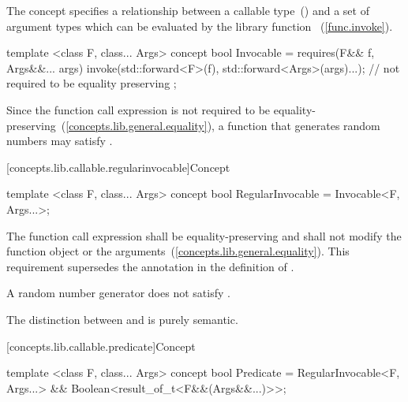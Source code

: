 \pnum
The  concept specifies a relationship between a callable
type~()  and a set of argument types  which
can be evaluated by the library function ~(\ref{func.invoke}).

%
\begin{itemdecl}
template <class F, class... Args>
concept bool Invocable =
  requires(F&& f, Args&&... args) {
    invoke(std::forward<F>(f), std::forward<Args>(args)...); // not required to be equality preserving
  };
\end{itemdecl}

\begin{itemdescr}
\pnum
\enternote Since the  function call
expression is not required to be
equality-preserving~(\ref{concepts.lib.general.equality}), a function that generates random numbers
may satisfy .\exitnote
\end{itemdescr}

[concepts.lib.callable.regularinvocable]{Concept }

%
\begin{itemdecl}
template <class F, class... Args>
concept bool RegularInvocable =
  Invocable<F, Args...>;
\end{itemdecl}

\begin{itemdescr}
\pnum
The  function call expression shall be equality-preserving and
shall not modify the function object or the arguments~(\ref{concepts.lib.general.equality}).
\enternote This requirement supersedes the
annotation in the definition of . \exitnote

\pnum
\enternote A random number generator does not satisfy
.\exitnote

\pnum
\enternote The distinction between  and
 is purely semantic.\exitnote
\end{itemdescr}

[concepts.lib.callable.predicate]{Concept }

%
\begin{itemdecl}
template <class F, class... Args>
concept bool Predicate =
  RegularInvocable<F, Args...> &&
  Boolean<result_of_t<F&&(Args&&...)>>;
\end{itemdecl}

